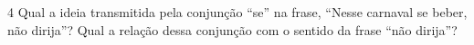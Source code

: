 
\num{4} Qual a ideia transmitida pela conjunção ``se'' na frase, 
``Nesse carnaval se beber, não dirija''? Qual a relação dessa conjunção 
com o sentido da frase ``não dirija''?







